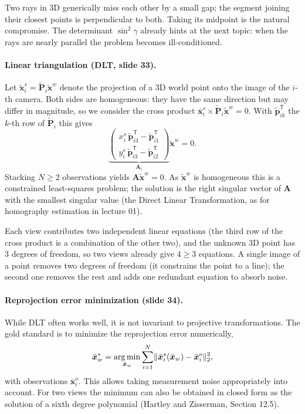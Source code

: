 \documentclass[11pt,a4paper]{article}
\newcommand{\tr}{^{\mathsf T}}
\DeclareMathOperator*{\argmin}{arg\,min}
\theoremstyle{definition}
\theoremstyle{plain}
\theoremstyle{remark}
\begin{document}
\begin{intuition}
Two rays in 3D generically miss each other by a small gap; the segment joining their closest points is perpendicular to both. Taking its midpoint is the natural compromise. The determinant $\sin^2\gamma$ already hints at the next topic: when the rays are nearly parallel the problem becomes ill-conditioned.
\end{intuition}

\paragraph{Linear triangulation (DLT, slide 33).}
Let $\tilde{\bm x}^s_i=\tilde{\bm P}_i\tilde{\bm x}^w$ denote the projection of a 3D world point onto the image of the $i$-th camera. Both sides are homogeneous: they have the same direction but may differ in magnitude, so we consider the cross product $\bar{\bm x}^s_i\times\tilde{\bm P}_i\tilde{\bm x}^w=0$. With $\tilde{\bm p}_{ik}\tr$ the $k$-th row of $\tilde{\bm P}_i$ this gives
\[
\underbrace{\begin{pmatrix}x^s_i\,\tilde{\bm p}_{i3}\tr-\tilde{\bm p}_{i1}\tr\\ y^s_i\,\tilde{\bm p}_{i3}\tr-\tilde{\bm p}_{i2}\tr\end{pmatrix}}_{\bm A_i}\tilde{\bm x}^w=0 .
\]
Stacking $N\ge2$ observations yields $\bm A\tilde{\bm x}^w=0$. As $\tilde{\bm x}^w$ is homogeneous this is a constrained least-squares problem; the solution is the right singular vector of $\bm A$ with the smallest singular value (the Direct Linear Transformation, as for homography estimation in lecture 01).

\begin{intuition}
Each view contributes two independent linear equations (the third row of the cross product is a combination of the other two), and the unknown 3D point has 3 degrees of freedom, so two views already give $4\ge3$ equations. A single image of a point removes two degrees of freedom (it constrains the point to a line); the second one removes the rest and adds one redundant equation to absorb noise.
\end{intuition}

\paragraph{Reprojection error minimization (slide 34).} While DLT often works well, it is not invariant to projective transformations. The gold standard is to minimize the reprojection error numerically,
\[
\bar{\bm x}^*_w=\argmin_{\bar{\bm x}_w}\sum_{i=1}^N\norm{\bar{\bm x}^s_i(\bar{\bm x}_w)-\bar{\bm x}^o_i}_2^2,
\]
with observations $\bar{\bm x}^o_i$. This allows taking measurement noise appropriately into account. For two views the minimum can also be obtained in closed form as the solution of a sixth degree polynomial (Hartley and Zisserman, Section 12.5).
\end{document}
